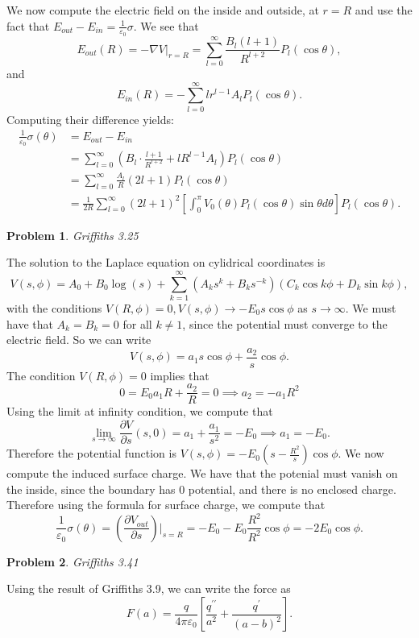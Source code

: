 \documentclass[12pt, a4paper]{article}
\newtheorem{problem}{Problem}
\theoremstyle{definition}
\newcommand{\grad}{\nabla}
\newcommand{\ep}{\varepsilon}
\begin{document}
We now compute the electric field on the inside and outside, at $r=R$ and use the fact that $E_{out} - E_{in} = \frac{1}{\ep_0} \sigma$. 
We see that $$E_{out}(R) = - \grad V|_{r=R} = \sum_{l=0}^\infty \frac{B_l (l+1)}{R^{l+2}} P_l(\cos \theta),$$
and 
$$E_{in}(R) = -\sum_{l=0}^\infty l r^{l-1} A_l P_l(\cos \theta).$$
Computing their difference yields: 
\begin{align*} \frac{1}{\ep_0} \sigma(\theta)& =  E_{out} - E_{in}
	\\ &= \sum_{l=0}^\infty \left(B_l \cdot\frac{l+1}{R^{l+2}}  + l R^{l-1} A_l \right) P_l(\cos \theta)
	\\ &  = \sum_{l=0}^\infty \frac{A_l}{R}(2l+1) P_l(\cos \theta)
	\\ & = \frac{1}{2R}  \sum_{l=0}^\infty (2l+1)^2 \left[\int_0^\pi V_0(\theta) P_l(\cos \theta) \sin \theta d\theta \right] P_l(\cos \theta). 
\end{align*}
\newpage
\begin{problem}
	Griffiths 3.25
\end{problem}
The solution to the Laplace equation on cylidrical coordinates is 
$$V(s,\phi) = A_0+  B_0 \log(s) + \sum_{k=1}^\infty \left( A_k s^k + B_k s^{-k} \right) \left(C_k \cos k \phi + D_k \sin k\phi \right), $$
with the conditions $V(R, \phi) = 0,V(s, \phi) \to -E_0s \cos \phi $ as $s\to \infty$. 
We must have that $A_k=B_k =0$ for all $k \neq 1$, since the potential must converge to the electric field. So we can write $$V(s, \phi) = a_1s \cos \phi + \frac{a_2}{s} \cos \phi . $$
The condition $V(R, \phi) = 0$ implies that 
$$0 = E_0a_1 R + \frac{a_2}{R} = 0 \implies a_2 = -a_1 R^2$$
Using the limit at infinity condition, we compute that 
$$\lim_{s\to \infty} \frac{\partial V}{\partial s}(s,0) =  a_1 + \frac{a_1}{s^2} = -E_0 \implies a_1 =-E_0.  $$
Therefore the potential function is $V(s, \phi ) = -E_0 \left(s - \frac{R^2}{s} \right) \cos \phi $. We now compute the induced surface charge. 
We have that the potenial must vanish on the inside, since the boundary has $0$ potential, and there is no enclosed charge. Therefore using the formula for surface charge, we compute that 
$$ \frac{1}{\ep_0} \sigma(\theta) =\left(\frac{\partial V_{out}}{\partial s }  \right)\Big|_{s=R} = -E_0 -E_0\frac{R^2}{R^2} \cos \phi = -2E_0 \cos \phi . $$
\newpage
\begin{problem}
Griffiths 3.41
\end{problem}
Using the result of Griffiths 3.9, we can write the force as 
$$F(a) = \frac{q}{4\pi \ep_0} \left[\frac{q^{\prime \prime}}{a^2} + \frac{q^\prime}{(a-b)^2} \right]. $$
\end{document}

